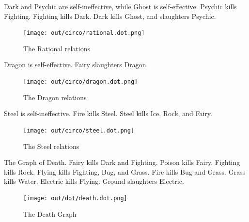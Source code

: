 Dark and Psychic are self-ineffective, while Ghost is self-effective.
Psychic kills Fighting.
Fighting kills Dark.
Dark kills Ghost, and slaughters Psychic.
\begin{figure}
\centering
\texttt{[image: out/circo/rational.dot.png]}
\caption{The Rational relations}
\end{figure}

Dragon is self-effective.
Fairy slaughters Dragon.
\begin{figure}
\centering
\texttt{[image: out/circo/dragon.dot.png]}
\caption{The Dragon relations}
\end{figure}

Steel is self-ineffective.
Fire kills Steel.
Steel kills Ice, Rock, and Fairy.
\begin{figure}
\centering
\texttt{[image: out/circo/steel.dot.png]}
\caption{The Steel relations}
\end{figure}

The Graph of Death.
Fairy kills Dark and Fighting.
Poison kills Fairy.
Fighting kills Rock.
Flying kills Fighting, Bug, and Grass.
Fire kills Bug and Grass.
Grass kills Water.
Electric kills Flying.
Ground slaughters Electric.
\begin{figure}
\centering
\texttt{[image: out/dot/death.dot.png]}
\caption{The Death Graph}
\end{figure}
